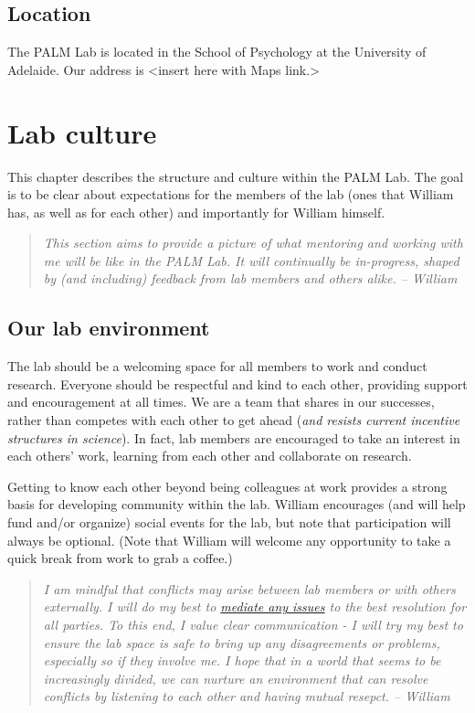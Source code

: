 \documentclass[
]{book}
\begin{document}
\hypertarget{location}{%
\section{Location}\label{location}}

The PALM Lab is located in the School of Psychology at the University of Adelaide. Our address is \textless insert here with Maps link.\textgreater{}

\hypertarget{lab-culture}{%
\chapter{Lab culture}\label{lab-culture}}

This chapter describes the structure and culture within the PALM Lab. The goal is to be clear about expectations for the members of the lab (ones that William has, as well as for each other) and importantly for William himself.

\begin{quote}
\emph{This section aims to provide a picture of what mentoring and working with me will be like in the PALM Lab. It will continually be in-progress, shaped by (and including) feedback from lab members and others alike. -- William}
\end{quote}

\hypertarget{lab-environment}{%
\section{Our lab environment}\label{lab-environment}}

The lab should be a welcoming space for all members to work and conduct research. Everyone should be respectful and kind to each other, providing support and encouragement at all times. We are a team that shares in our successes, rather than competes with each other to get ahead (\emph{and resists current incentive structures in science}). In fact, lab members are encouraged to take an interest in each others' work, learning from each other and collaborate on research.

Getting to know each other beyond being colleagues at work provides a strong basis for developing community within the lab. William encourages (and will help fund and/or organize) social events for the lab, but note that participation will always be optional. (Note that William will welcome any opportunity to take a quick break from work to grab a coffee.)

\begin{quote}
\emph{I am mindful that conflicts may arise between lab members or with others externally. I will do my best to \protect\hyperlink{conflicts}{mediate any issues} to the best resolution for all parties. To this end, I value clear communication - I will try my best to ensure the lab space is safe to bring up any disagreements or problems, especially so if they involve me. I hope that in a world that seems to be increasingly divided, we can nurture an environment that can resolve conflicts by listening to each other and having mutual resepct. -- William}
\end{quote}
\end{document}
